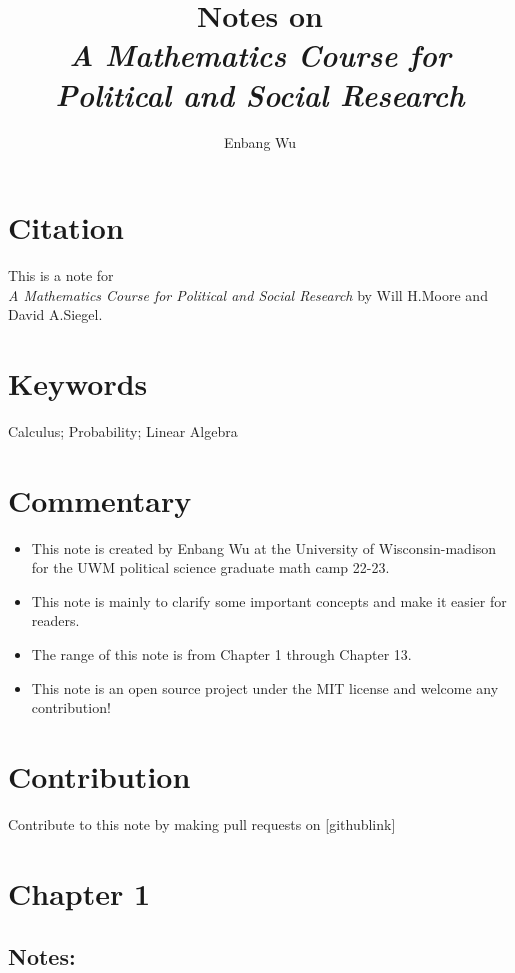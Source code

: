 \documentclass{article}
\title{Notes on \\ \textit{A Mathematics Course for Political and Social Research}}
\author{Enbang Wu}
\begin{document}
\maketitle

\section{Citation}
This is a note for \\ \textit{A Mathematics Course for Political and Social Research} by Will H.Moore and David A.Siegel.

\section{Keywords}
Calculus; Probability; Linear Algebra


\section{Commentary}
\begin{itemize}
    \item This note is created by Enbang Wu at the University of Wisconsin-madison for the UWM political science graduate math camp 22-23.
    \item This note is mainly to clarify some important concepts and make it easier for readers.
    \item The range of this note is from Chapter 1 through Chapter 13.
    \item This note is an open source project under the MIT license and welcome any contribution!
\end{itemize}

\section{Contribution}
Contribute to this note by making pull requests on [githublink]

\newpage
\tableofcontents
\newpage

\section{Chapter 1}
\subsection{Notes:}
\end{document}

